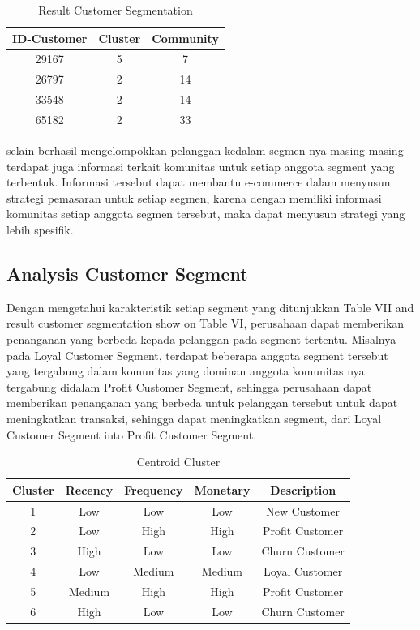 \documentclass[conference]{IEEEtran}
\begin{document}
\begin{table}[h]
\renewcommand{\arraystretch}{1.3}
\caption{Result Customer Segmentation}
\label{tab:result_all}
\centering
\begin{tabular}{c|c|c}
    \hline
    ID-Customer & Cluster & Community\\
    \hline
    29167 & 5 & 7\\
    \hline
    26797 & 2 & 14\\
    \hline
    33548 & 2 & 14\\
    \hline
    65182 & 2 & 33\\
    \hline
\end{tabular}
\end{table}

selain berhasil mengelompokkan pelanggan kedalam segmen nya masing-masing terdapat juga informasi terkait komunitas untuk setiap anggota segment yang terbentuk. Informasi tersebut dapat membantu e-commerce dalam menyusun strategi pemasaran untuk setiap segmen, karena dengan memiliki informasi komunitas setiap anggota segmen tersebut, maka dapat menyusun strategi yang lebih spesifik.

\subsection{Analysis Customer Segment}
Dengan mengetahui karakteristik setiap segment yang ditunjukkan Table VII and result customer segmentation show on Table VI, perusahaan dapat memberikan penanganan yang berbeda kepada pelanggan pada segment tertentu. Misalnya pada Loyal Customer Segment, terdapat beberapa anggota segment tersebut yang tergabung dalam komunitas yang dominan anggota komunitas nya tergabung didalam Profit Customer Segment, sehingga perusahaan dapat memberikan penanganan yang berbeda untuk pelanggan tersebut untuk dapat meningkatkan transaksi, sehingga dapat meningkatkan segment, dari Loyal Customer Segment into Profit Customer Segment.

\begin{table}[h]
\renewcommand{\arraystretch}{1.3}
\caption{Centroid Cluster}
\label{tab:centroid_cluster}
\centering
\begin{tabular}{c|c|c|c|c}
    \hline
    Cluster & Recency & Frequency & Monetary & Description\\
    \hline
    1 & Low & Low & Low & New Customer\\
    \hline
    2 & Low & High & High & Profit Customer\\
    \hline
    3 & High & Low & Low & Churn Customer\\
    \hline
    4 & Low & Medium & Medium & Loyal Customer\\
    \hline
    5 & Medium & High & High & Profit Customer\\
    \hline
    6 & High & Low & Low & Churn Customer\\
    \hline
\end{tabular}
\end{table}
\end{document}
